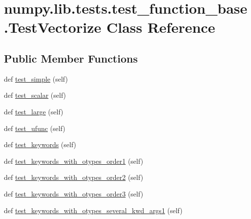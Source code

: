 \hypertarget{classnumpy_1_1lib_1_1tests_1_1test__function__base_1_1TestVectorize}{}\section{numpy.\+lib.\+tests.\+test\+\_\+function\+\_\+base.\+Test\+Vectorize Class Reference}
\label{classnumpy_1_1lib_1_1tests_1_1test__function__base_1_1TestVectorize}
\subsection*{Public Member Functions}
\begin{DoxyCompactItemize}
\item 
def \hyperlink{classnumpy_1_1lib_1_1tests_1_1test__function__base_1_1TestVectorize_acff95f275279965de98b430584069567}{test\+\_\+simple} (self)
\item 
def \hyperlink{classnumpy_1_1lib_1_1tests_1_1test__function__base_1_1TestVectorize_a33c32cb6d855703f98695bfb8c81680c}{test\+\_\+scalar} (self)
\item 
def \hyperlink{classnumpy_1_1lib_1_1tests_1_1test__function__base_1_1TestVectorize_a446eee73515a157204d9c55d865b553c}{test\+\_\+large} (self)
\item 
def \hyperlink{classnumpy_1_1lib_1_1tests_1_1test__function__base_1_1TestVectorize_a2212fc99fc52d9bd9f7ef48f48b39d4b}{test\+\_\+ufunc} (self)
\item 
def \hyperlink{classnumpy_1_1lib_1_1tests_1_1test__function__base_1_1TestVectorize_ab9b38d7403ab3b30180c62b946b61d2f}{test\+\_\+keywords} (self)
\item 
def \hyperlink{classnumpy_1_1lib_1_1tests_1_1test__function__base_1_1TestVectorize_adecc20f7d5d96f3068308ce6ce62de60}{test\+\_\+keywords\+\_\+with\+\_\+otypes\+\_\+order1} (self)
\item 
def \hyperlink{classnumpy_1_1lib_1_1tests_1_1test__function__base_1_1TestVectorize_a30018573f59f8a972efd5ea190723ab1}{test\+\_\+keywords\+\_\+with\+\_\+otypes\+\_\+order2} (self)
\item 
def \hyperlink{classnumpy_1_1lib_1_1tests_1_1test__function__base_1_1TestVectorize_ade91adbfc45afd99ea7761f7d46ad85e}{test\+\_\+keywords\+\_\+with\+\_\+otypes\+\_\+order3} (self)
\item 
def \hyperlink{classnumpy_1_1lib_1_1tests_1_1test__function__base_1_1TestVectorize_a1fe9090d9937d780cbd966e5987bb7d8}{test\+\_\+keywords\+\_\+with\+\_\+otypes\+\_\+several\+\_\+kwd\+\_\+args1} (self)

\end{DoxyCompactItemize}
